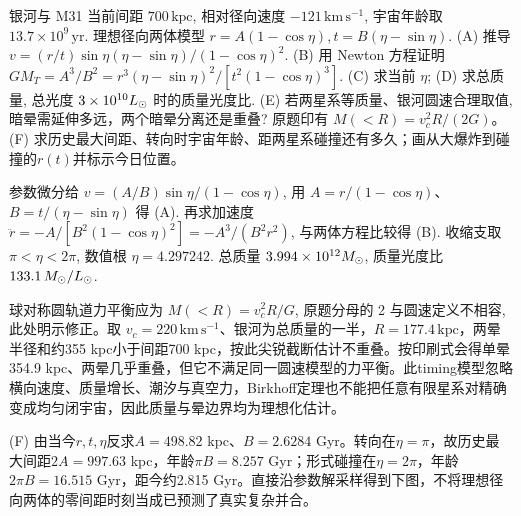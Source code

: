 \begin{exercise}
银河与 M31 当前间距 $700\,\mathrm{kpc}$, 相对径向速度 $-121\,\mathrm{km\,s^{-1}}$, 宇宙年龄取 $13.7\times10^9\,\mathrm{yr}$. 理想径向两体模型 $r=A(1-\cos\eta),t=B(\eta-\sin\eta)$.
(A) 推导 $v=(r/t)\sin\eta(\eta-\sin\eta)/(1-\cos\eta)^2$.
(B) 用 Newton 方程证明 $GM_T=A^3/B^2=r^3(\eta-\sin\eta)^2/[t^2(1-\cos\eta)^3]$.
(C) 求当前 $\eta$; (D) 求总质量, 总光度 $3\times10^{10}L_{\odot}$ 时的质量光度比.
(E) 若两星系等质量、银河圆速合理取值, 暗晕需延伸多远，两个暗晕分离还是重叠? 原题印有 $M(<R)=v_c^2R/(2G)$。
(F) 求历史最大间距、转向时宇宙年龄、距两星系碰撞还有多久；画从大爆炸到碰撞的$r(t)$并标示今日位置。
\end{exercise}
\begin{solution}
参数微分给 $v=(A/B)\sin\eta/(1-\cos\eta)$, 用 $A=r/(1-\cos\eta)$、$B=t/(\eta-\sin\eta)$ 得 (A). 再求加速度 $\ddot r=-A/[B^2(1-\cos\eta)^2]=-A^3/(B^2r^2)$, 与两体方程比较得 (B). 收缩支取 $\pi<\eta<2\pi$, 数值根 $\eta=4.297242$. 总质量 $3.994\times10^{12}M_{\odot}$, 质量光度比 $133.1\,M_{\odot}/L_{\odot}$.

球对称圆轨道力平衡应为 $M(<R)=v_c^2R/G$, 原题分母的 2 与圆速定义不相容, 此处明示修正。取 $v_c=220\,\mathrm{km\,s^{-1}}$、银河为总质量的一半，$R=177.4\,\mathrm{kpc}$，两晕半径和约355 kpc小于间距700 kpc，按此尖锐截断估计不重叠。按印刷式会得单晕354.9 kpc、两晕几乎重叠，但它不满足同一圆速模型的力平衡。此timing模型忽略横向速度、质量增长、潮汐与真空力，Birkhoff定理也不能把任意有限星系对精确变成均匀闭宇宙，因此质量与晕边界均为理想化估计。

(F) 由当今$r,t,\eta$反求$A=498.82$ kpc、$B=2.6284$ Gyr。转向在$\eta=\pi$，故历史最大间距$2A=997.63$ kpc，年龄$\pi B=8.257$ Gyr；形式碰撞在$\eta=2\pi$，年龄$2\pi B=16.515$ Gyr，距今约2.815 Gyr。直接沿参数解采样得到下图，不将理想径向两体的零间距时刻当成已预测了真实复杂并合。
\begin{center}\end{center}
\end{solution}

